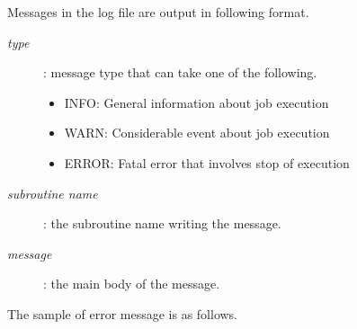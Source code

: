 \vspace{2ex}
Messages in the log file are output in following format.
\begin{description}
 \item[{\it type}]: message type that can take one of the following.
   \begin{itemize}
    \item INFO: General information about job execution
    \item WARN: Considerable event about job execution
    \item ERROR: Fatal error that involves stop of execution
   \end{itemize}
 \item[{\it subroutine name}]: the subroutine name writing the message.
 \item[{\it message}]: the main body of the message.
\end{description}


\noindent The sample of error message is as follows.

